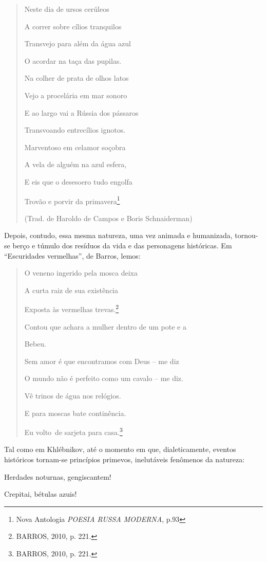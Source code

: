 \begin{quote}
Neste dia de ursos cerúleos

A correr sobre cílios tranquilos

Transvejo para além da água azul

O acordar na taça das pupilas.

Na colher de prata de olhos latos

Vejo a procelária em mar sonoro

E ao largo vai a Rússia dos pássaros

Transvoando entrecílios ignotos.

Marventoso em celamor soçobra

A vela de alguém na azul esfera,

E eis que o desesoero tudo engolfa

Trovão e porvir da primavera\footnote{Nova Antologia \emph{POESIA RUSSA
  MODERNA}, p.93}

(Trad. de Haroldo de Campos e Boris Schnaiderman)
\end{quote}

Depois, contudo, essa mesma natureza, uma vez animada e humanizada,
tornou-se berço e túmulo dos resíduos da vida e das personagens
históricas. Em ``Escuridades vermelhas'', de Barros, lemos:

\begin{quote}
O veneno ingerido pela mosca deixa

A curta raiz de sua existência

Exposta às vermelhas trevas.\footnote{BARROS, 2010, p. 221.}

Contou que achara a mulher dentro de um pote e a

Bebeu.

Sem amor é que encontramos com Deus -- me diz

O mundo não é perfeito como um cavalo -- me diz.

Vê trinos de água nos relógios.

E para moscas bate continência.

Eu volto~de sarjeta para casa.\footnote{BARROS, 2010, p. 221.}
\end{quote}

Tal como em Khlébnikov, até o momento em que, dialeticamente, eventos
históricos tornam-se princípios primevos, inelutáveis fenômenos da
natureza:

Herdades noturnas, gengiscantem!

Crepitai, bétulas azuis!

